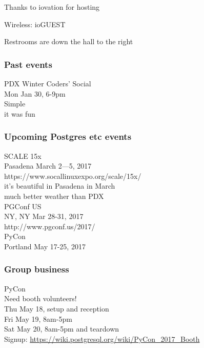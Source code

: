\documentclass{beamer}
\begin{document}

\frame
{
  \begin{center}
  \item[]Thanks to iovation for hosting
  \item[]Wireless: ioGUEST
  \item[]Restrooms are down the hall to the right
  \end{center}
}

\frame
{
  \frametitle{Past events}
  \begin{center}
 {\large PDX Winter Coders' Social\\}
Mon Jan 30, 6-9pm\\
Simple\\
  
{\tiny it was fun\\}
  \vspace{5mm}
  \end{center}
}

\frame
{
  \frametitle{Upcoming Postgres etc events}
  \begin{center}
 {\large SCALE 15x\\}
Pasadena March 2—5, 2017\\
https://www.socallinuxexpo.org/scale/15x/\\
  \vspace{2mm}
  {\tiny it's beautiful in Pasadena in March\\
  much better weather than PDX\\}
  \vspace{5mm}
 {\large PGConf US\\}
NY, NY Mar 28-31, 2017\\
http://www.pgconf.us/2017/\\
  \vspace{5mm}
 {\large PyCon\\}
 Portland May 17-25, 2017
  \end{center}
}

\frame
{
  \frametitle{Group business}
  \begin{center}
{\large PyCon\\}
Need booth volunteers!\\
Thu May 18, setup and reception\\
Fri May 19, 8am-5pm\\
Sat May 20, 8am-5pm and teardown\\
\vspace{5mm}
Signup: \url{https://wiki.postgresql.org/wiki/PyCon_2017_Booth}
\vspace{5mm}
  \end{center}
}
\end{document}
